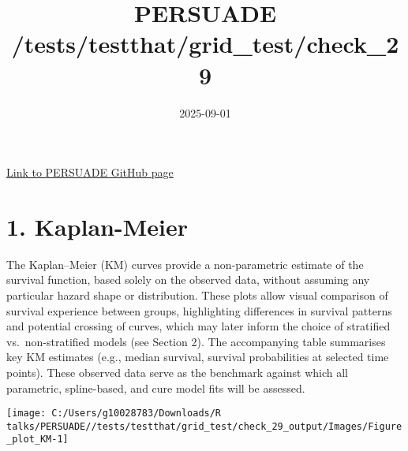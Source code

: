\documentclass[
]{article}
\title{PERSUADE /tests/testthat/grid\_test/check\_29}
\author{}
\date{\vspace{-2.5em}2025-09-01}
\begin{document}
\maketitle

{
\hypersetup{linkcolor=}
\setcounter{tocdepth}{2}
\tableofcontents
}
\hfill\break

\href{https://github.com/Bram-R/PERSUADE}{Link to PERSUADE GitHub page}

\clearpage

\section{1. Kaplan-Meier}\label{kaplan-meier}

The Kaplan--Meier (KM) curves provide a non-parametric estimate of the
survival function, based solely on the observed data, without assuming
any particular hazard shape or distribution. These plots allow visual
comparison of survival experience between groups, highlighting
differences in survival patterns and potential crossing of curves, which
may later inform the choice of stratified vs.~non-stratified models (see
Section 2). The accompanying table summarises key KM estimates (e.g.,
median survival, survival probabilities at selected time points). These
observed data serve as the benchmark against which all parametric,
spline-based, and cure model fits will be assessed.

\clearpage

\begin{flushleft}\texttt{[image: C:/Users/g10028783/Downloads/R talks/PERSUADE//tests/testthat/grid\_test/check\_29\_output/Images/Figure\_plot\_KM-1]} \end{flushleft}

\begin{table}[H]
\centering
\caption{\label{tab:Table_1}Observed survival data}
\centering
{}
\end{table}
\end{document}
